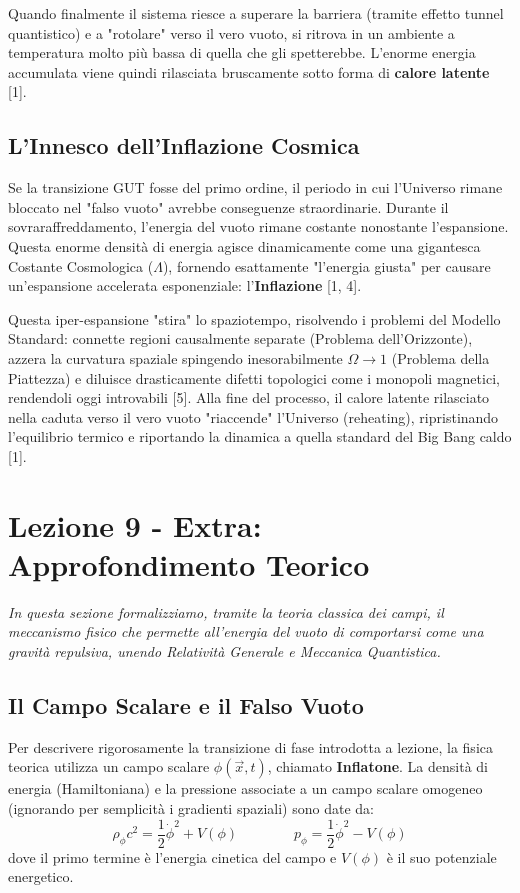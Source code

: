\documentclass[11pt,a4paper]{report}
\begin{document}
Quando finalmente il sistema riesce a superare la barriera (tramite effetto tunnel quantistico) e a "rotolare" verso il vero vuoto, si ritrova in un ambiente a temperatura molto più bassa di quella che gli spetterebbe. L'enorme energia accumulata viene quindi rilasciata bruscamente sotto forma di \textbf{calore latente} [1]. 

\subsection{L'Innesco dell'Inflazione Cosmica}
Se la transizione GUT fosse del primo ordine, il periodo in cui l'Universo rimane bloccato nel "falso vuoto" avrebbe conseguenze straordinarie. 
Durante il sovraraffreddamento, l'energia del vuoto rimane costante nonostante l'espansione. Questa enorme densità di energia agisce dinamicamente come una gigantesca Costante Cosmologica ($\Lambda$), fornendo esattamente "l'energia giusta" per causare un'espansione accelerata esponenziale: l'\textbf{Inflazione} [1, 4].

Questa iper-espansione "stira" lo spaziotempo, risolvendo i problemi del Modello Standard: connette regioni causalmente separate (Problema dell'Orizzonte), azzera la curvatura spaziale spingendo inesorabilmente $\Omega \to 1$ (Problema della Piattezza) e diluisce drasticamente difetti topologici come i monopoli magnetici, rendendoli oggi introvabili [5]. Alla fine del processo, il calore latente rilasciato nella caduta verso il vero vuoto "riaccende" l'Universo (reheating), ripristinando l'equilibrio termico e riportando la dinamica a quella standard del Big Bang caldo [1].

\newpage
\section{Lezione 9 - Extra: Approfondimento Teorico}

\textit{In questa sezione formalizziamo, tramite la teoria classica dei campi, il meccanismo fisico che permette all'energia del vuoto di comportarsi come una gravità repulsiva, unendo Relatività Generale e Meccanica Quantistica.}

\subsection{Il Campo Scalare e il Falso Vuoto}
Per descrivere rigorosamente la transizione di fase introdotta a lezione, la fisica teorica utilizza un campo scalare $\phi(\vec{x},t)$, chiamato \textbf{Inflatone}. La densità di energia (Hamiltoniana) e la pressione associate a un campo scalare omogeneo (ignorando per semplicità i gradienti spaziali) sono date da:
\begin{equation}
\rho_\phi c^2 = \frac{1}{2}\dot{\phi}^2 + V(\phi) \qquad \qquad p_\phi = \frac{1}{2}\dot{\phi}^2 - V(\phi)
\end{equation}
dove il primo termine è l'energia cinetica del campo e $V(\phi)$ è il suo potenziale energetico. 
\end{document}
